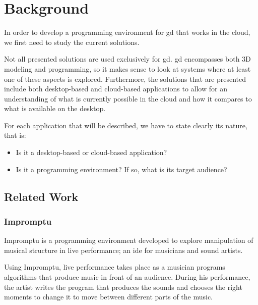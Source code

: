 
\chapter{Background}
\label{chapter:background}
In order to develop a programming environment for \gls{gd} that works in the cloud, we first need to study the current solutions.

Not all presented solutions are used exclusively for \gls{gd}.
\gls{gd} encompasses both 3D modeling and programming, so it makes sense to look at systems where at least one of these aspects is explored.
Furthermore, the solutions that are presented include both desktop-based and cloud-based applications to allow for an understanding of what is currently possible in the cloud and how it compares to what is available on the desktop.

For each application that will be described, we have to state clearly its nature, that is:
\begin{itemize}
	\item Is it a desktop-based or cloud-based application?
	\item Is it a programming environment? If so, what is its target audience?
\end{itemize}


\section{Related Work}


\subsection{Impromptu}
\label{section:impromptu:related}
Impromptu\cite{sorensen2005impromptu,sorensen2010programming} is a programming environment developed to explore manipulation of musical structure in live performance; an \gls{ide} for musicians and sound artists.

Using Impromptu, live performance takes place as a musician programs algorithms that produce music in front of an audience.
During his performance, the artist writes the program that produces the sounds and chooses the right moments to change it to move between different parts of the music.

